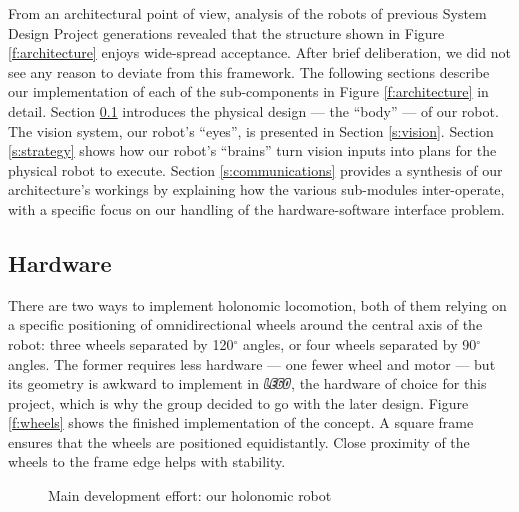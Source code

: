\documentclass[journal,a4paper,12pt]{IEEEtran}
\newcommand*{\LEGO}{\includegraphics[height=8pt]{lego.png}\xspace}
\newcommand*{\degree}{\ensuremath{^\circ}\xspace}
\begin{document}
From an architectural point of view, analysis of the robots of previous System Design Project generations revealed that the structure shown in Figure \ref{f:architecture} enjoys wide-spread acceptance. After brief deliberation, we did not see any reason to deviate from this framework. The following sections describe our implementation of each of the sub-components in Figure \ref{f:architecture} in detail. Section \ref{s:hardware} introduces the physical design --- the ``body'' --- of our robot. The vision system, our robot's ``eyes'', is presented in Section \ref{s:vision}. Section \ref{s:strategy} shows how our robot's ``brains'' turn vision inputs into plans for the physical robot to execute. Section \ref{s:communications} provides a synthesis of our architecture's workings by explaining how the various sub-modules inter-operate, with a specific focus on our handling of the hardware-software interface problem.


\subsection{Hardware}\label{s:hardware}

There are two ways to implement holonomic locomotion, both of them relying on a specific positioning of omnidirectional wheels around the central axis of the robot: three wheels separated by 120\degree angles, or four wheels separated by 90\degree angles. The former requires less hardware --- one fewer wheel and motor --- but its geometry is awkward to implement in \LEGO, the hardware of choice for this project, which is why the group decided to go with the later design. Figure \ref{f:wheels} shows the finished implementation of the concept. A square frame ensures that the wheels are positioned equidistantly. Close proximity of the wheels to the frame edge helps with stability.

\begin{figure}[!htb]
\centering
  \caption{Main development effort: our holonomic robot}
  \label{f:robot}
\end{figure}
\end{document}
